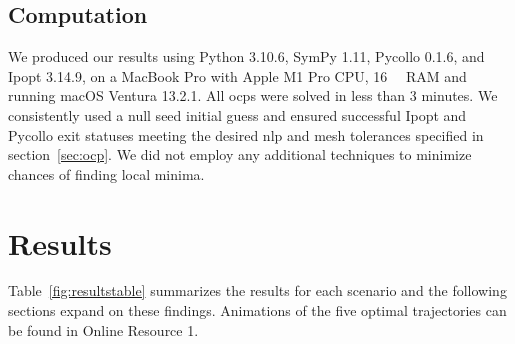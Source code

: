 \documentclass[default,iicol,pdflatex]{sn-jnl}
\begin{document}
\subsection{Computation}
We produced our results using Python 3.10.6, SymPy 1.11, Pycollo 0.1.6, and Ipopt 3.14.9, on a MacBook Pro with Apple M1 Pro CPU, \SI{16}{\giga\byte} RAM and running macOS Ventura 13.2.1.
All \glspl{ocp} were solved in less than 3 minutes.
We consistently used a null seed initial guess and ensured successful Ipopt and Pycollo exit statuses meeting the desired \gls{nlp} and mesh tolerances specified in section~\ref{sec:ocp}. We did not employ any additional techniques to minimize chances of finding local minima.


\section{Results}
%
Table~\ref{fig:resultstable} summarizes the results for each scenario and the following sections expand on these findings. Animations of the five optimal trajectories can be found in Online Resource 1.
%
\end{document}
